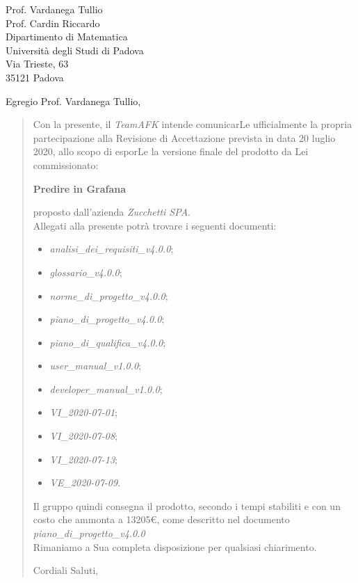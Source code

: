 \begin{letter}{
		Prof. Vardanega Tullio \\
		Prof. Cardin Riccardo \\
		Dipartimento di Matematica \\
		Università degli Studi di Padova \\
		Via Trieste, 63 \\
		35121 Padova}
		
\opening{Egregio Prof. Vardanega Tullio,}

\begin{quotation}
Con la presente, il \textit{TeamAFK} intende comunicarLe ufficialmente la propria partecipazione alla Revisione di Accettazione prevista in data 20 luglio 2020, allo scopo di esporLe la versione finale del prodotto da Lei commissionato:

\begin{center}
	\textbf{Predire in Grafana}
\end{center}

\noindent proposto dall'azienda \textit{Zucchetti SPA}.\\
Allegati alla presente potrà trovare i seguenti documenti:
\begin{itemize}
	\item \textit{analisi\_dei\_requisiti\_v4.0.0};
	
	\item \textit{glossario\_v4.0.0};
	
	\item \textit{norme\_di\_progetto\_v4.0.0};

	\item \textit{piano\_di\_progetto\_v4.0.0};

	\item \textit{piano\_di\_qualifica\_v4.0.0};
	
	\item \textit{user\_manual\_v1.0.0};
	\item \textit{developer\_manual\_v1.0.0};
	
	\item \textit{VI\_2020-07-01};
	\item \textit{VI\_2020-07-08};
	\item \textit{VI\_2020-07-13};
	\item \textit{VE\_2020-07-09}.
\end{itemize}
\pagebreak
\noindent 
Il gruppo quindi consegna il prodotto, secondo i tempi stabiliti e con un costo che ammonta a 13205€, come descritto nel documento \textit{piano\_di\_progetto\_v4.0.0}\\
Rimaniamo a Sua completa disposizione per qualsiasi chiarimento.

\vspace{0.5cm}
\closing{ Cordiali Saluti,}
	

\end{quotation}
		
\end{letter}